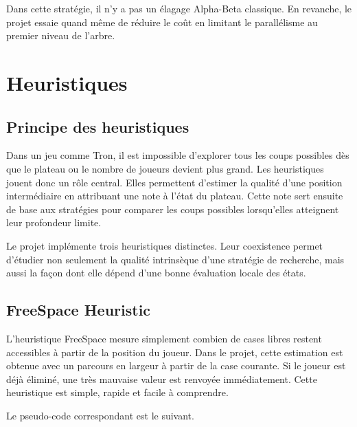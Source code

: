 \documentclass[11pt,a4paper]{article}
\begin{document}
Dans cette stratégie, il n'y a pas un élagage Alpha-Beta classique. En revanche, le projet essaie quand même de réduire le coût en limitant le parallélisme au premier niveau de l'arbre.

\section{Heuristiques}

\subsection{Principe des heuristiques}

Dans un jeu comme Tron, il est impossible d'explorer tous les coups possibles dès que le plateau ou le nombre de joueurs devient plus grand. Les heuristiques jouent donc un rôle central. Elles permettent d'estimer la qualité d'une position intermédiaire en attribuant une note à l'état du plateau. Cette note sert ensuite de base aux stratégies pour comparer les coups possibles lorsqu'elles atteignent leur profondeur limite.

Le projet implémente trois heuristiques distinctes. Leur coexistence permet d'étudier non seulement la qualité intrinsèque d'une stratégie de recherche, mais aussi la façon dont elle dépend d'une bonne évaluation locale des états.

\subsection{FreeSpace Heuristic}

L'heuristique FreeSpace mesure simplement combien de cases libres restent accessibles à partir de la position du joueur. Dans le projet, cette estimation est obtenue avec un parcours en largeur à partir de la case courante. Si le joueur est déjà éliminé, une très mauvaise valeur est renvoyée immédiatement. Cette heuristique est simple, rapide et facile à comprendre.

Le pseudo-code correspondant est le suivant.
\end{document}
